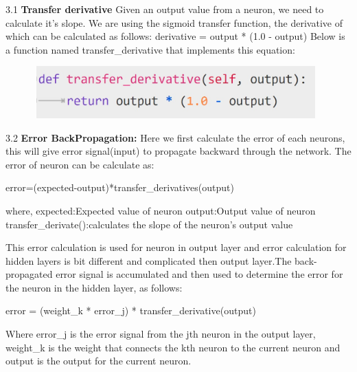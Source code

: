 { 3.1 \textbf{Transfer derivative}\newline
 Given an output value from a neuron, we need to calculate it’s slope. We are using the sigmoid transfer function, the derivative of which can be calculated as follows:\newline
        derivative = output * (1.0 - output)\newline
 Below is a function named transfer\_derivative that implements this equation:
 \begin{figure}[H]
\begin{center}
\includegraphics[width=110mm,height=20mm]{backexplain/transferDerivative.jpg}
\end{center}
\end{figure} 

3.2 \textbf{Error BackPropagation:}\newline
Here we first calculate the error of each neurons, this will give error signal(input) to propagate backward through the network.\newline
The error of neuron can be calculate as:\newline
 \centerline{error=(expected-output)*transfer\_derivatives(output)}
where,\newline
expected:Expected value of neuron \newline 
output:Output value of neuron\newline
transfer\_derivate():calculates the slope of the neuron’s output value

This error calculation is used for neuron in output layer and error calculation for hidden layers is bit different and complicated then output layer.\newline The back-propagated error signal is accumulated and then used to determine the error for the neuron in the hidden layer, as follows:\newline
           \centerline{error = (weight\_k * error\_j) * transfer\_derivative(output)}
Where error\_j is the error signal from the jth neuron in the output layer, weight\_k is the weight that connects the kth neuron to the current neuron and output is the output for the current neuron.

}

